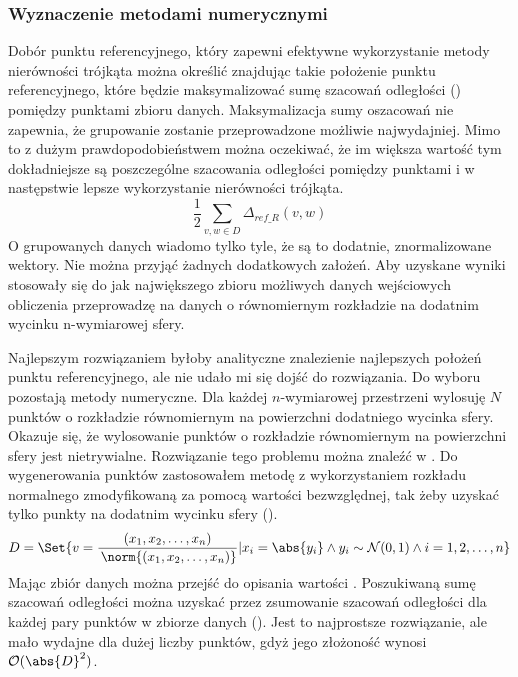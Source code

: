 \subsubsection*{Wyznaczenie metodami numerycznymi}
Dobór punktu referencyjnego, który zapewni efektywne wykorzystanie metody nierówności trójkąta można określić znajdując takie położenie punktu referencyjnego, które będzie maksymalizować sumę szacowań odległości () pomiędzy punktami zbioru danych. Maksymalizacja sumy oszacowań nie zapewnia, że grupowanie zostanie przeprowadzone możliwie najwydajniej. Mimo to z dużym prawdopodobieństwem można oczekiwać, że im większa wartość  tym dokładniejsze są poszczególne szacowania odległości pomiędzy punktami i w następstwie lepsze wykorzystanie nierówności trójkąta.
\begin{equation}
	\frac{1}{2}\sum_{v,w \in D} \Delta_{ref\_R}(v,w)
	\label{ti:max-ti-d}
\end{equation}
O grupowanych danych wiadomo tylko tyle, że są to dodatnie, znormalizowane wektory. Nie można przyjąć żadnych dodatkowych założeń. Aby uzyskane wyniki stosowały się do jak największego zbioru możliwych danych wejściowych obliczenia przeprowadzę na danych o równomiernym rozkładzie na dodatnim wycinku n-wymiarowej sfery.\par
Najlepszym rozwiązaniem byłoby analityczne znalezienie najlepszych położeń punktu referencyjnego, ale nie udało mi się dojść do rozwiązania. Do wyboru pozostają metody numeryczne. Dla każdej $ n $-wymiarowej przestrzeni wylosuję $ N $ punktów o rozkładzie równomiernym na powierzchni dodatniego wycinka sfery. Okazuje się, że wylosowanie punktów o rozkładzie równomiernym na powierzchni sfery jest nietrywialne. Rozwiązanie tego problemu można znaleźć w \cite{pickfromsphere}. Do wygenerowania punktów zastosowałem metodę z wykorzystaniem rozkładu normalnego zmodyfikowaną za pomocą wartości bezwzględnej, tak żeby uzyskać tylko punkty na dodatnim wycinku sfery (). 
\begin{equation}
	D = \Set{ v = \frac{(x_1, x_2, \dots, x_n)}{\,\norm{(x_1, x_2, \dots, x_n)}} | x_i=\abs{y_i} \land y_i \sim \mathcal{N}(0,1) \land i=1,2,\dots,n}
	\label{ti:uni-rand-on-sphere}
\end{equation}
Mając zbiór danych można przejść do opisania wartości . Poszukiwaną sumę szacowań odległości można uzyskać przez zsumowanie szacowań odległości dla każdej pary punktów w zbiorze danych (). Jest to najprostsze rozwiązanie, ale mało wydajne dla dużej liczby punktów, gdyż jego złożoność wynosi $ \mathcal{O}(\abs{D}^2) $.\par
